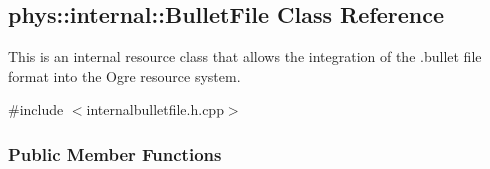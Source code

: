 \hypertarget{classphys_1_1internal_1_1BulletFile}{
\subsection{phys::internal::BulletFile Class Reference}
\label{d4/dcc/classphys_1_1internal_1_1BulletFile}
}


This is an internal resource class that allows the integration of the .bullet file format into the Ogre resource system.  




{\ttfamily \#include $<$internalbulletfile.h.cpp$>$}

\subsubsection*{Public Member Functions}
